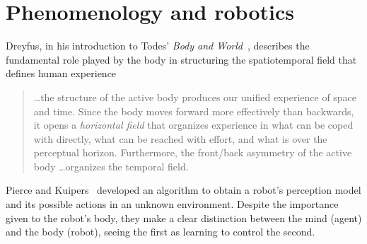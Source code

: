 \documentclass{article}
\begin{document}
\section{Phenomenology and robotics}


Dreyfus, in his introduction to Todes' \emph{Body and World}~\cite{todes2001},
describes the fundamental role played by the body in structuring the
spatiotemporal field that defines human experience

\begin{quotation}
  \dots the structure of the active body produces our unified experience of
  space and time. Since the body moves forward more effectively than backwards,
  it opens a \emph{horizontal field} that organizes experience in what can be
  coped with directly, what can be reached with effort, and what is over the
  perceptual horizon. Furthermore, the front/back asymmetry of the active body
  \dots organizes the temporal field.
\end{quotation}


Pierce and Kuipers~\cite{pierce1997} developed an algorithm to obtain a robot's
perception model and its possible actions in an unknown environment. Despite the
importance given to the robot's body, they make a clear distinction between the
mind (agent) and the body (robot), seeing the first as learning to control the
second.

\end{document}

